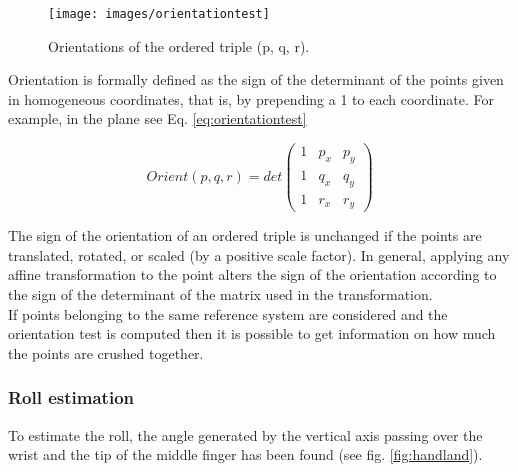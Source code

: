 \begin{figure}[H]
	\centering
	\texttt{[image: images/orientationtest]}
	\caption[Orientation test.]{Orientations of the ordered triple (p, q, r).}
	\label{fig:orientationtest}
\end{figure}

\noindent Orientation is formally defined as the sign of the determinant of the points given in homogeneous coordinates, that is, by prepending a 1 to each coordinate. For example, in the plane see Eq. \ref{eq:orientationtest}

\begin{Equation}[!htb]
	\centering
	\begin{equation} \label{eq:orientationtest}
		Orient(p,q,r) = det
		\begin{pmatrix}
			1 & p_x & p_y \\
			1 & q_x & q_y \\
			1 & r_x & r_y 
		\end{pmatrix}
		\end{equation}
	\caption[Orientation test.]{Thus orientation generalizes the familiar \gls{1d} binary relations $<, =, >$.}
\end{Equation}

\noindent The sign of the orientation of an ordered triple is unchanged if the points are translated, rotated, or scaled (by a positive scale factor). In general, applying any affine transformation to the point alters the sign of the orientation according to the sign of the determinant of the matrix used in the transformation. \\

\noindent If points belonging to the same reference system are considered and the orientation test is computed then it is possible to get information on how much the points are crushed together. 

\subsubsection{Roll estimation}
\label{subsec:roll}
To estimate the roll, the angle generated by the vertical axis passing over the wrist and the tip of the middle finger has been found (see fig. \ref{fig:handland}).

